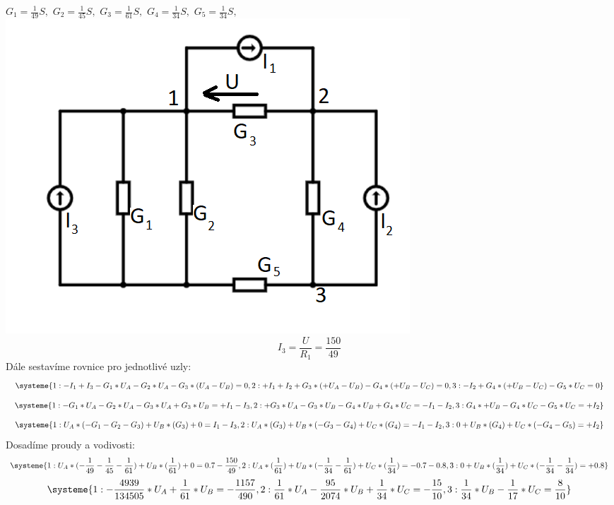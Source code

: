 \documentclass[11pt]{article}
\begin{document}
$G_1 = \frac{1}{49}S, $
$G_2 = \frac{1}{45}S, $
$G_3 = \frac{1}{61}S, $
$G_4 = \frac{1}{34}S, $
$G_5 = \frac{1}{34}S, $\\
\includegraphics[width=0.8\linewidth]{priklad3_oznaceni.png}
$$I_3 = \frac{U}{R_1} = \frac{150}{49}$$
Dále sestavíme rovnice pro jednotlivé uzly:
\begin{equation*}
  \systeme{
  1: -I_1 + I_3 - G_1 * U_A - G_2 * U_A -G_3 * (U_A - U_B) = 0,
  2: +I_1 + I_2 + G_3 * (+U_A - U_B) - G_4 * (+U_B - U_C) = 0,
  3: - I_2 + G_4 * (+U_B - U_C) - G_5 * U_C = 0
  }
\end{equation*}
\begin{equation*}
  \systeme{
  1: - G_1 * U_A - G_2 * U_A -G_3 * U_A + G_3 * U_B = + I_1 - I_3 ,
  2: + G_3 * U_A - G_3 * U_B - G_4 * U_B + G_4 * U_C = -I_1 - I_2 ,
  3: G_4 * +U_B -G_4 * U_C - G_5 * U_C = + I_2
  }
\end{equation*}
\begin{equation*}
  \systeme{
  1: U_A*(-G_1 - G_2 - G_3) +U_B * (G_3) + 0 = I_1 - I_3,
  2: U_A*(G_3) + U_B*(-G_3 - G_4) + U_C*(G_4) = -I_1 - I_2 ,
  3:  0 + U_B*(G_4) + U_C*(-G_4 - G_5) = + I_2
  }
\end{equation*}
\newpage
Dosadíme proudy a vodivosti:
\begin{equation*}
  \systeme{
  1: U_A*(-\frac{1}{49} - \frac{1}{45} - \frac{1}{61}) +U_B * (\frac{1}{61}) + 0 = 0.7 - \frac{150}{49},
  2: U_A*(\frac{1}{61}) + U_B*(-\frac{1}{34} - \frac{1}{61}) + U_C*(\frac{1}{34}) = -0.7 - 0.8 ,
  3:  0 + U_B*(\frac{1}{34}) + U_C*(-\frac{1}{34} - \frac{1}{34}) = + 0.8
  }
\end{equation*}
\begin{equation*}
  \systeme{
  1: -\frac{4939}{134505}*U_A + \frac{1}{61}*U_B = -\frac{1157}{490},
  2: \frac{1}{61}*U_A - \frac{95}{2074}*U_B + \frac{1}{34}*U_C = -\frac{15}{10},
  3: \frac{1}{34}*U_B - \frac{1}{17}*U_C = \frac{8}{10}
  }
\end{equation*}
\end{document}
